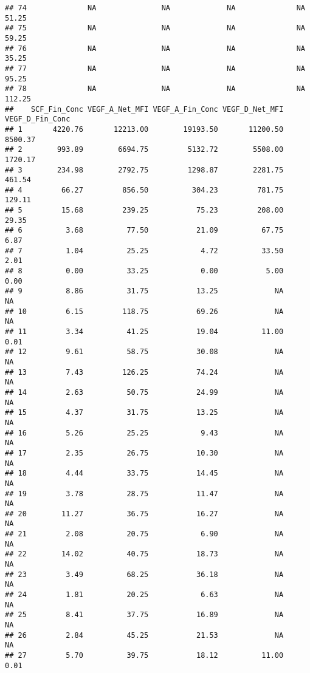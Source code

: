 \documentclass[]{article}
\begin{document}
\begin{verbatim}
## 74              NA               NA             NA              NA       51.25
## 75              NA               NA             NA              NA       59.25
## 76              NA               NA             NA              NA       35.25
## 77              NA               NA             NA              NA       95.25
## 78              NA               NA             NA              NA      112.25
##    SCF_Fin_Conc VEGF_A_Net_MFI VEGF_A_Fin_Conc VEGF_D_Net_MFI VEGF_D_Fin_Conc
## 1       4220.76       12213.00        19193.50       11200.50         8500.37
## 2        993.89        6694.75         5132.72        5508.00         1720.17
## 3        234.98        2792.75         1298.87        2281.75          461.54
## 4         66.27         856.50          304.23         781.75          129.11
## 5         15.68         239.25           75.23         208.00           29.35
## 6          3.68          77.50           21.09          67.75            6.87
## 7          1.04          25.25            4.72          33.50            2.01
## 8          0.00          33.25            0.00           5.00            0.00
## 9          8.86          31.75           13.25             NA              NA
## 10         6.15         118.75           69.26             NA              NA
## 11         3.34          41.25           19.04          11.00            0.01
## 12         9.61          58.75           30.08             NA              NA
## 13         7.43         126.25           74.24             NA              NA
## 14         2.63          50.75           24.99             NA              NA
## 15         4.37          31.75           13.25             NA              NA
## 16         5.26          25.25            9.43             NA              NA
## 17         2.35          26.75           10.30             NA              NA
## 18         4.44          33.75           14.45             NA              NA
## 19         3.78          28.75           11.47             NA              NA
## 20        11.27          36.75           16.27             NA              NA
## 21         2.08          20.75            6.90             NA              NA
## 22        14.02          40.75           18.73             NA              NA
## 23         3.49          68.25           36.18             NA              NA
## 24         1.81          20.25            6.63             NA              NA
## 25         8.41          37.75           16.89             NA              NA
## 26         2.84          45.25           21.53             NA              NA
## 27         5.70          39.75           18.12          11.00            0.01

\end{verbatim}
\end{document}
